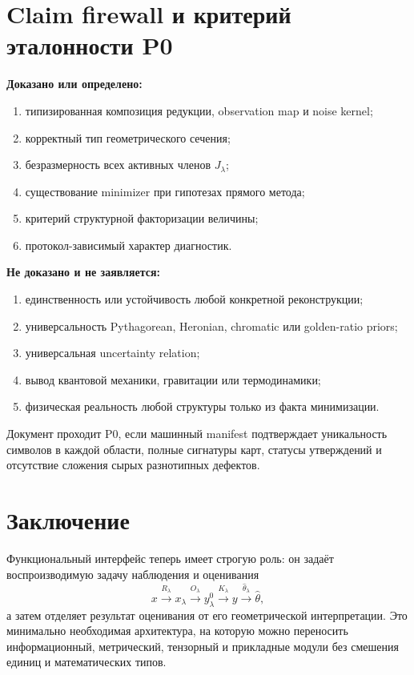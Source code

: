 \documentclass[11pt,a4paper]{article}
\theoremstyle{definition}
\theoremstyle{plain}
\theoremstyle{remark}
\begin{document}
\section{Claim firewall и критерий эталонности P0}

\textbf{Доказано или определено:}
\begin{enumerate}[leftmargin=*]
\item типизированная композиция редукции, observation map и noise kernel;
\item корректный тип геометрического сечения;
\item безразмерность всех активных членов $J_\lambda$;
\item существование minimizer при гипотезах прямого метода;
\item критерий структурной факторизации величины;
\item протокол-зависимый характер диагностик.
\end{enumerate}

\textbf{Не доказано и не заявляется:}
\begin{enumerate}[leftmargin=*]
\item единственность или устойчивость любой конкретной реконструкции;
\item универсальность Pythagorean, Heronian, chromatic или
golden-ratio priors;
\item универсальная uncertainty relation;
\item вывод квантовой механики, гравитации или термодинамики;
\item физическая реальность любой структуры только из факта минимизации.
\end{enumerate}

Документ проходит P0, если машинный manifest подтверждает уникальность
символов в каждой области, полные сигнатуры карт, статусы утверждений и
отсутствие сложения сырых разнотипных дефектов.

\section{Заключение}

Функциональный интерфейс теперь имеет строгую роль: он задаёт
воспроизводимую задачу наблюдения и оценивания
\[
x
\xrightarrow{R_\lambda}
x_\lambda
\xrightarrow{O_\lambda}
y_\lambda^0
\xrightarrow{K_\lambda}
y
\xrightarrow{\widehat\theta_\lambda}
\widehat\theta,
\]
а затем отделяет результат оценивания от его геометрической интерпретации.
Это минимально необходимая архитектура, на которую можно переносить
информационный, метрический, тензорный и прикладные модули без смешения
единиц и математических типов.
\end{document}
